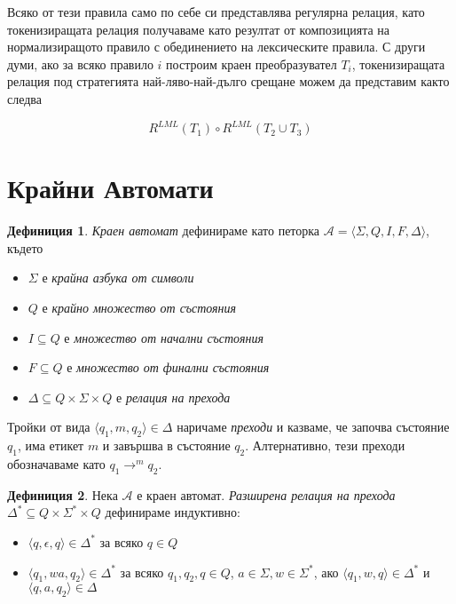 \documentclass[11pt, oneside]{article}
\theoremstyle{definition}
\newtheorem{definition}{Дефиниция}[section]
\begin{document}
Всяко от тези правила само по себе си представлява регулярна релация, като токенизиращата релация получаваме като резултат от композицията на нормализиращото правило с обединението на лексическите правила. С други думи, ако за всяко правило \(i\) построим краен преобразувател \(T_i\), токенизиращата релация под стратегията най-ляво-най-дълго срещане можем да представим както следва

\[ R^{LML}(T_1) \circ R^{LML}(T_2 \cup T_3) \]

\section{Крайни Автомати}

\begin{definition}
	\emph{Краен автомат} дефинираме като петорка \( \mathcal{A} = \langle \Sigma, Q, I, F, \Delta \rangle \), където

	\begin{itemize}
		\item \( \Sigma \) е \emph{крайна азбука от символи}
		\item \( Q \) е \emph{крайно множество от състояния}
		\item \( I \subseteq Q \) е \emph{множество от начални състояния}
		\item \( F \subseteq Q \) е \emph{множество от финални състояния}
		\item \( \Delta \subseteq Q \times \Sigma \times Q \) е \emph{релация на прехода}
	\end{itemize}
 
	Тройки от вида \( \langle q_1, m, q_2 \rangle \in \Delta \) наричаме \emph{преходи} и казваме, че започва състояние \( q_1 \), има етикет \( m \) и завършва в състояние \( q_2 \). Алтернативно, тези преходи обозначаваме като \( q_1 \to^m q_2 \).
\end{definition}

\begin{definition}  
	Нека \( \mathcal{A} \) е краен автомат. \emph{Разширена релация на прехода} \( \Delta^* \subseteq Q \times \Sigma^* \times Q \) дефинираме индуктивно:

	\begin{itemize}
		\item \( \langle q, \epsilon, q \rangle \in \Delta^* \) за всяко \( q \in Q \)
		\item \( \langle q_1, wa, q_2 \rangle \in \Delta^* \) за всяко \( q_1, q_2, q \in Q \), \( a \in \Sigma, w \in \Sigma^* \), ако \( \langle q_1, w, q \rangle \in \Delta^* \) и \( \langle q, a, q_2 \rangle \in \Delta \)
	\end{itemize}
\end{definition}
\end{document}
